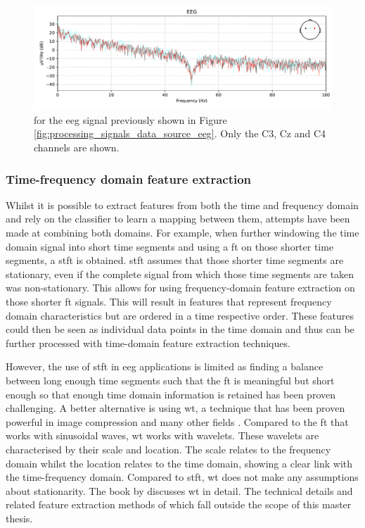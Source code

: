 \begin{figure}[t]
    \centering
    \includegraphics[width=\linewidth]{../images/pipeline/psd.pdf}
    \captionsetup{width=0.9\linewidth}
    \captionsetup{justification=centering}
    \caption{ for the \gls{eeg} signal previously shown in Figure \ref{fig:processing_signals_data_source_eeg}. Only the C3, Cz and C4 channels are shown.}
    \label{fig:processing_signals_psd}
\end{figure}


\subsubsection{Time-frequency domain feature extraction}
\label{subsubsec:processing_signals_general_pipeline_features_timefreqdomain}

Whilst it is possible to extract features from both the time and frequency domain and rely on the classifier to learn a mapping between them, attempts have been made at combining both domains.
For example, when further windowing the time domain signal into short time segments and using a \gls{ft} on those shorter time segments, a \gls{stft} is obtained.
\Gls{stft} assumes that those shorter time segments are stationary, even if the complete signal from which those time segments are taken was non-stationary.
This allows for using frequency-domain feature extraction on those shorter \gls{ft} signals.
This will result in features that represent frequency domain characteristics but are ordered in a time respective order.
These features could then be seen as individual data points in the time domain and thus can be further processed with time-domain feature extraction techniques.

However, the use of \gls{stft} in \gls{eeg} applications is limited as finding a balance between long enough time segments such that the \gls{ft} is meaningful but short enough so that enough time domain information is retained has been proven challenging.
A better alternative is using \gls{wt}, a technique that has been proven powerful in image compression and many other fields \citep{wavelet_transform_uses}.
Compared to the \gls{ft} that works with sinusoidal waves, \gls{wt} works with wavelets.
These wavelets are characterised by their scale and location.
The scale relates to the frequency domain whilst the location relates to the time domain, showing a clear link with the time-frequency domain.
Compared to \gls{stft}, \gls{wt} does not make any assumptions about stationarity.
The book by \citet{book_wavelet} discusses \gls{wt} in detail.
The technical details and related feature extraction methods of which fall outside the scope of this master thesis.

